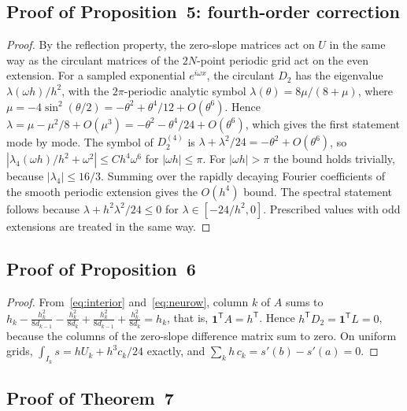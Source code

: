\documentclass[11pt]{article}
\begin{document}
\subsection*{Proof of Proposition~5: fourth-order correction}
\begin{proof}
By the reflection property, the zero-slope matrices act on $U$ in the same way as the circulant matrices
of the $2N$-point periodic grid act on the even extension. For a sampled exponential $e^{i\omega x}$, the
circulant $D_2$ has the eigenvalue $\lambda(\omega h)/h^2$, with the $2\pi$-periodic analytic symbol
$\lambda(\theta)=8\mu/(8+\mu)$, where $\mu=-4\sin^2(\theta/2)=-\theta^2+\theta^4/12+O(\theta^6)$. Hence
$\lambda=\mu-\mu^2/8+O(\mu^3)=-\theta^2-\theta^4/24+O(\theta^6)$, which gives the first statement mode by
mode. The symbol of $D_2^{(4)}$ is $\lambda+\lambda^2/24=-\theta^2+O(\theta^6)$, so
$|\lambda_4(\omega h)/h^2+\omega^2|\le Ch^4\omega^6$ for $|\omega h|\le\pi$. For $|\omega h|>\pi$ the bound
holds trivially, because $|\lambda_4|\le16/3$. Summing over the rapidly decaying Fourier coefficients of
the smooth periodic extension gives the $O(h^4)$ bound. The spectral statement follows because
$\lambda+h^2\lambda^2/24\le0$ for $\lambda\in[-24/h^2,0]$. Prescribed values with odd extensions are
treated in the same way.
\end{proof}

\subsection*{Proof of Proposition~6}
\begin{proof}
From~\eqref{eq:interior} and~\eqref{eq:neurow}, column $k$ of $A$ sums to
$h_k-\frac{h_k^2}{8d_{k-1}}-\frac{h_k^2}{8d_k}+\frac{h_k^2}{8d_{k-1}}+\frac{h_k^2}{8d_k}=h_k$, that is,
$\mathbf 1^{\mathsf T}A=h^{\mathsf T}$. Hence $h^{\mathsf T}D_2=\mathbf 1^{\mathsf T}L=0$, because the columns of
the zero-slope difference matrix sum to zero. On uniform grids, $\int_{I_k}s=hU_k+h^3c_k/24$ exactly, and
$\sum_kh\,c_k=s'(b)-s'(a)=0$.
\end{proof}


\subsection*{Proof of Theorem~7}
\end{document}
